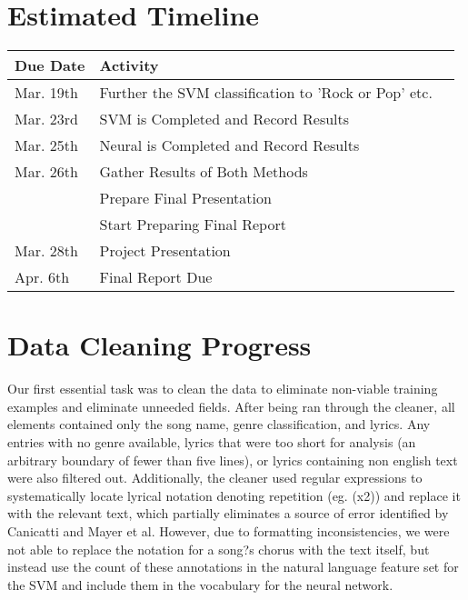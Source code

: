\documentclass[journal]{IEEEtran}
\begin{document}
\section{Estimated Timeline}

\begin{table}[h!]
  \begin{center}
    \label{tab:table1}
    \begin{tabular}{l|l|l|}
      \textbf{Due Date} & \textbf{Activity}\\

      \hline

Mar. 19th & Further the SVM classification to 'Rock or Pop' etc.\\
Mar. 	23rd & SVM is Completed and Record Results \\
Mar. 	25th & Neural is Completed and Record Results \\
Mar. 	26th & Gather Results of Both Methods \\
		&Prepare Final Presentation \\
		& Start Preparing Final Report \\
Mar. 	28th & Project Presentation\\
Apr. 	6th & Final Report Due\\

    \end{tabular}
  \end{center}
\end{table}


\section{Data Cleaning Progress}

Our first essential task was to clean the data to eliminate non-viable training examples and eliminate unneeded fields. After being ran through the cleaner, all elements contained only the song name, genre classification, and lyrics. Any entries with no genre available, lyrics that were too short for analysis (an arbitrary boundary of fewer than five lines), or lyrics containing non english text were also filtered out. Additionally, the cleaner used regular expressions to systematically locate lyrical notation denoting repetition (eg. (x2)) and replace it with the relevant text, which partially eliminates a source of error identified by Canicatti and Mayer et al. However, due to formatting inconsistencies, we were not able to replace the notation for a song?s chorus with the text itself, but instead use the count of these annotations in the natural language feature set for the SVM and include them in the vocabulary for the neural network.
\end{document}
